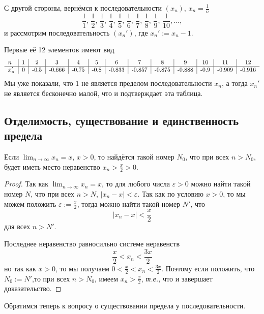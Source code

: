 \begin{example}
    С другой стороны, вернёмся к последовательности $(x_n)$, $x_n = \frac{1}{n}$
     \[
      \frac{1}{1}, \,\frac{1}{2}, \,\frac{1}{3}, \, \frac{1}{4}, \, \frac{1}{5}, \, \frac{1}{6},\, \frac{1}{7},\, \frac{1}{8},\, \frac{1}{9},\, \frac{1}{10},  \ldots,
    \]
и рассмотрим последовательность $(x_n')$, где $x_n':= x_n - 1$. 

Первые её 12 элементов имеют вид
        \[
         \begin{tabular}{l|c|c|c|c|c|c|c|c|c|c|c|c}
             $n$ & 1&2&3&4&5&6&7&8&9&10&11&12  \\
             \hline
             $x_n'$&  0 & -0.5 & -0.666 & -0.75 & -0.8 & -0.833 & -0.857& -0.875 & -0.888 & -0.9 & -0.909 & -0.916   
         \end{tabular}
        \]
Мы уже показали, что $1$ не является пределом последовательности $x_n$, а тогда $x_n'$ не является бесконечно малой, что и подтверждает эта таблица.
\end{example}




\subsection{Отделимость, существование и единственность предела}



\begin{theorem}[Отделимость]\label{separate}
    Если $\lim_{n\to \infty } x_n = x$, $x>0$, то найдётся такой номер $N_0$, что при всех $n>N_0$, будет иметь место неравенство $x_n > \frac{x}{2}>0.$
\end{theorem}

\begin{proof}
Так как $\lim_{n\to \infty } x_n = x$, то для любого числа $\varepsilon>0$ можно найти такой номер $N$, что при всех $n>N$, $|x_n-x|<\varepsilon$. Так как по условию $x>0$, то мы можем положить $\varepsilon := \frac{x}{2}$, тогда можно найти такой номер $N'$, что
\[
 |x_n - x|<\frac{x}{2}
\]
для всех $n>N'$.

Последнее неравенство равносильно системе неравенств
\[
 \frac{x}{2}< x_n < \frac{3x}{2}
\]
но так как $x>0$, то мы получаем $0<\frac{x}{2}< x_n < \frac{3x}{2}$. Поэтому если положить, что $N_0 :=N'$,то при всех $n>N_0$, имеем $x_n > \frac{x}{2}$, \textit{т.е.,} что и завершает доказательство.
\end{proof}

Обратимся теперь к вопросу о существовании предела у последовательности.

